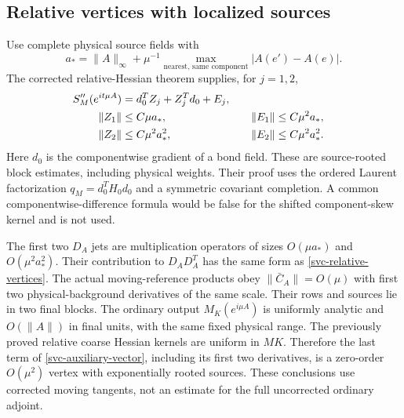 \documentclass[11pt]{article}
\theoremstyle{remark}
\begin{document}
\subsection{Relative vertices with localized sources}
\label{svc-vertices-section}

Use complete physical source fields with
\[
 a_* =\|A\|_\infty+
       \mu^{-1}\max_{\text{nearest, same component}}|A(e')-A(e)|.
\]
The corrected relative-Hessian theorem supplies, for $j=1,2$,
\begin{align}
 [t^j]S_M''(e^{it\mu A})
     &=d_0^TZ_j+Z_j^Td_0+E_j,\notag\\
 \|Z_1\|&\le C\mu a_*,&\quad \|E_1\|&\le C\mu^2a_*,\notag\\
 \|Z_2\|&\le C\mu^2a_*^2,&\quad \|E_2\|&\le C\mu^2a_*^2.
 \label{svc-relative-vertices}
\end{align}
Here $d_0$ is the componentwise gradient of a bond field. These are
source-rooted block estimates, including physical weights.
Their proof uses the ordered Laurent factorization
$q_M=d_0^TH_0d_0$ and a symmetric covariant completion. A common
componentwise-difference formula would be false for the shifted
component-skew kernel and is not used.

The first two $D_A$ jets are multiplication operators of sizes
$O(\mu a_*)$ and $O(\mu^2a_*^2)$. Their contribution to
$D_AD_A^T$ has the same form as \eqref{svc-relative-vertices}.
The actual moving-reference products obey
$\|\bar C_A\|=O(\mu)$ with first two physical-background derivatives
of the same scale. Their rows and sources lie in two final blocks.
The ordinary output $M_K(e^{i\mu A})$ is uniformly analytic and
$O(\|A\|)$ in final units, with the same fixed physical range.
The previously proved relative coarse Hessian kernels are uniform
in $MK$. Therefore the last term of
\eqref{svc-auxiliary-vector}, including its first two derivatives,
is a zero-order $O(\mu^2)$ vertex with exponentially rooted sources.
These conclusions use corrected moving tangents, not an estimate
for the full uncorrected ordinary adjoint.
\end{document}
